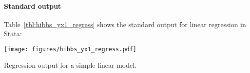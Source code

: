   \paragraph{Standard output}%
  Table~\ref{tbl:hibbs_yx1_regress} shows the standard output for linear regression in Stata:

  \begin{table}[htp]
      \texttt{[image: figures/hibbs\_yx1\_regress.pdf]}

    	\caption[Regression output for a simple linear model]{\label{tbl:hibbs_yx1_regress}
  	Regression output for a simple linear model.\\
  	}
  \end{table}%


